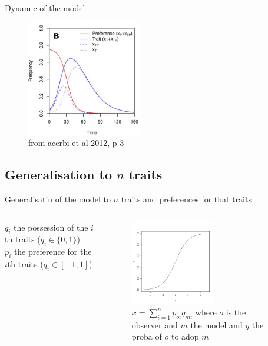 \documentclass{beamer}
\begin{document}
\begin{frame}{Dynamic of the model}


	\begin{figure}[h]
		\begin{center}
			\includegraphics[width=5cm]{dynamics.png}
		\end{center}
		\caption{ from acerbi et al 2012, p 3}
	\end{figure}
\end{frame}

\subsection{Generalisation to $n$ traits}
\begin{frame}{Generalisatin of the model to $n$ traits and preferences for that traits}
	\begin{columns}
		\begin{column}{.75\textwidth}
			$q_i$ the possession of the $i$th traits ($q_i \in \{0,1\}$)\\
			$p_i$ the preference for the $i$th traits ($q_i \in [-1,1]$)
		\end{column}
		\begin{column}{.4\textwidth}
			\begin{figure}[h]
				\begin{center}
					\includegraphics[width=3.7cm]{proba.pdf}
				\end{center}
				\caption{ $x=\sum\limits_{i=1}^{n}p_{oi}q_{mi}$ where $o$ is the observer and $m$ the model and $y$ the proba of $o$ to adop $m$}
			\end{figure}
		\end{column}
	\end{columns}
	
\end{frame}
\end{document}
